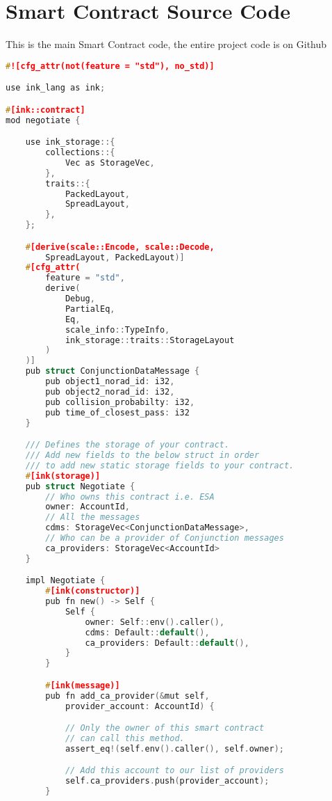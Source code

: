 \chapter{Smart Contract Source Code}

This is the main Smart Contract code, the entire project code is on Github \cite{github}

\begin{lstlisting}[label={source},language=c,caption={Smart Contract}]
#![cfg_attr(not(feature = "std"), no_std)]

use ink_lang as ink;

#[ink::contract]
mod negotiate {

    use ink_storage::{
        collections::{
            Vec as StorageVec,
        },
        traits::{
            PackedLayout,
            SpreadLayout,
        },
    };

    #[derive(scale::Encode, scale::Decode, 
        SpreadLayout, PackedLayout)]
    #[cfg_attr(
        feature = "std",
        derive(
            Debug,
            PartialEq,
            Eq,
            scale_info::TypeInfo,
            ink_storage::traits::StorageLayout
        )
    )]
    pub struct ConjunctionDataMessage {
        pub object1_norad_id: i32,
        pub object2_norad_id: i32,
        pub collision_probabilty: i32,
        pub time_of_closest_pass: i32
    }

    /// Defines the storage of your contract.
    /// Add new fields to the below struct in order
    /// to add new static storage fields to your contract.
    #[ink(storage)]
    pub struct Negotiate {
        // Who owns this contract i.e. ESA
        owner: AccountId,
        // All the messages
        cdms: StorageVec<ConjunctionDataMessage>,
        // Who can be a provider of Conjunction messages
        ca_providers: StorageVec<AccountId>
    }

    impl Negotiate {
        #[ink(constructor)]
        pub fn new() -> Self {
            Self { 
                owner: Self::env().caller(),
                cdms: Default::default(), 
                ca_providers: Default::default(), 
            }
        }

        #[ink(message)]
        pub fn add_ca_provider(&mut self, 
            provider_account: AccountId) {

            // Only the owner of this smart contract 
            // can call this method.
            assert_eq!(self.env().caller(), self.owner);

            // Add this account to our list of providers
            self.ca_providers.push(provider_account);
        }


\end{lstlisting}
